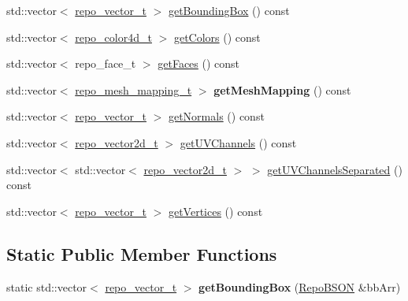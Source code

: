 \begin{DoxyCompactItemize}
\item 
std\+::vector$<$ \hyperlink{structrepo__vector__t}{repo\+\_\+vector\+\_\+t} $>$ \hyperlink{classrepo_1_1core_1_1model_1_1_mesh_node_a9a8d98653f384b8a0a642aec5f14665b}{get\+Bounding\+Box} () const 
\item 
std\+::vector$<$ \hyperlink{structrepo__color4d__t}{repo\+\_\+color4d\+\_\+t} $>$ \hyperlink{classrepo_1_1core_1_1model_1_1_mesh_node_a0fbecdd9cde9c11e4faae613657040b1}{get\+Colors} () const 
\item 
std\+::vector$<$ repo\+\_\+face\+\_\+t $>$ \hyperlink{classrepo_1_1core_1_1model_1_1_mesh_node_ab542b62a7ef4ea7f45a49769e679e999}{get\+Faces} () const 
\item 
\hypertarget{classrepo_1_1core_1_1model_1_1_mesh_node_acfb7939da55a97f8f070503fd03bbef5}{}std\+::vector$<$ \hyperlink{structrepo__mesh__mapping__t}{repo\+\_\+mesh\+\_\+mapping\+\_\+t} $>$ {\bfseries get\+Mesh\+Mapping} () const \label{classrepo_1_1core_1_1model_1_1_mesh_node_acfb7939da55a97f8f070503fd03bbef5}

\item 
std\+::vector$<$ \hyperlink{structrepo__vector__t}{repo\+\_\+vector\+\_\+t} $>$ \hyperlink{classrepo_1_1core_1_1model_1_1_mesh_node_a4cc4020f392b6ff3f033a65fc6ae95d9}{get\+Normals} () const 
\item 
std\+::vector$<$ \hyperlink{structrepo__vector2d__t}{repo\+\_\+vector2d\+\_\+t} $>$ \hyperlink{classrepo_1_1core_1_1model_1_1_mesh_node_a339a7467aba5856f31114dcae49f688b}{get\+U\+V\+Channels} () const 
\item 
std\+::vector$<$ std\+::vector$<$ \hyperlink{structrepo__vector2d__t}{repo\+\_\+vector2d\+\_\+t} $>$ $>$ \hyperlink{classrepo_1_1core_1_1model_1_1_mesh_node_ac3b3b4fc307f3eb64fde27ce39f8daed}{get\+U\+V\+Channels\+Separated} () const 
\item 
std\+::vector$<$ \hyperlink{structrepo__vector__t}{repo\+\_\+vector\+\_\+t} $>$ \hyperlink{classrepo_1_1core_1_1model_1_1_mesh_node_a2b03157eecf7bdf41534db3068178d05}{get\+Vertices} () const 
\end{DoxyCompactItemize}
\subsection*{Static Public Member Functions}
\begin{DoxyCompactItemize}
\item 
\hypertarget{classrepo_1_1core_1_1model_1_1_mesh_node_a77196efc86472f9ec298935f89d78ac8}{}static std\+::vector$<$ \hyperlink{structrepo__vector__t}{repo\+\_\+vector\+\_\+t} $>$ {\bfseries get\+Bounding\+Box} (\hyperlink{classrepo_1_1core_1_1model_1_1_repo_b_s_o_n}{Repo\+B\+S\+O\+N} \&bb\+Arr)\label{classrepo_1_1core_1_1model_1_1_mesh_node_a77196efc86472f9ec298935f89d78ac8}

\end{DoxyCompactItemize}
